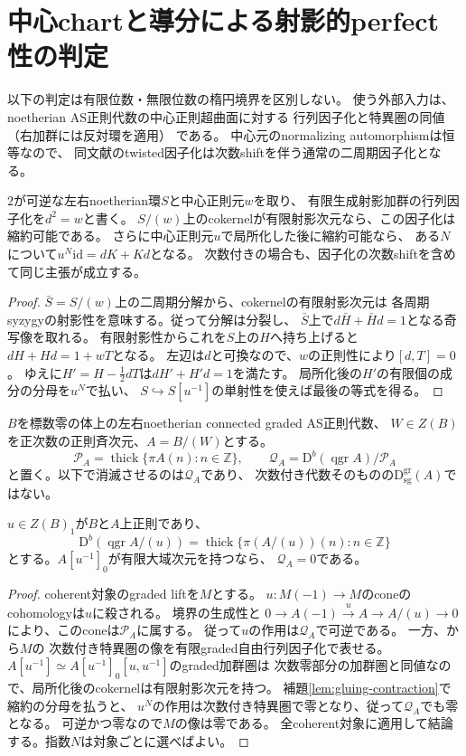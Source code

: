 \section{中心chartと導分による射影的perfect性の判定}
\label{sec:quotient-chart-gluing}
以下の判定は有限位数・無限位数の楕円境界を区別しない。
使う外部入力は、noetherian AS正則代数の中心正則超曲面に対する
行列因子化と特異圏の同値（右加群には反対環を適用）
\cite[Theorems~4.7, 5.5]{CCKM}である。
中心元のnormalizing automorphismは恒等なので、
同文献のtwisted因子化は次数shiftを伴う通常の二周期因子化となる。

\begin{lemma}[有限射影因子化の縮約と分母払い]
\label{lem:gluing-contraction}
$2$が可逆な左右noetherian環$S$と中心正則元$w$を取り、
有限生成射影加群の行列因子化を$d^2=w$と書く。
$S/(w)$上のcokernelが有限射影次元なら、この因子化は縮約可能である。
さらに中心正則元$u$で局所化した後に縮約可能なら、
ある$N$について$u^N\mathrm{id}=dK+Kd$となる。
次数付きの場合も、因子化の次数shiftを含めて同じ主張が成立する。
\end{lemma}
\begin{proof}
$\bar S=S/(w)$上の二周期分解から、cokernelの有限射影次元は
各周期syzygyの射影性を意味する。従って分解は分裂し、
$\bar S$上で$d\bar H+\bar Hd=1$となる奇写像を取れる。
有限射影性からこれを$S$上の$H$へ持ち上げると
$dH+Hd=1+wT$となる。
左辺は$d$と可換なので、$w$の正則性により$[d,T]=0$。
ゆえに$H'=H-\frac12dT$は$dH'+H'd=1$を満たす。
局所化後の$H'$の有限個の成分の分母を$u^N$で払い、
$S\hookrightarrow S[u^{-1}]$の単射性を使えば最後の等式を得る。
\end{proof}

$B$を標数零の体上の左右noetherian connected graded AS正則代数、
$W\in Z(B)$を正次数の正則斉次元、$A=B/(W)$とする。
\[
 \mathcal P_A=\operatorname{thick}\{\pi A(n):n\in\mathbb Z\},\qquad
 \mathcal Q_A=\mathrm D^b(\operatorname{qgr}A)/\mathcal P_A
\]
と置く。以下で消滅させるのは$\mathcal Q_A$であり、
次数付き代数そのものの$\mathrm D_{\mathrm{sg}}^{\mathrm{gr}}(A)$ではない。

\begin{proposition}[一つの中心chartと正則境界]
\label{prop:gluing-one-chart}
$u\in Z(B)_1$が$B$と$A$上正則であり、
\[
 \mathrm D^b(\operatorname{qgr}A/(u))
 =\operatorname{thick}\{\pi(A/(u))(n):n\in\mathbb Z\}
\]
とする。$A[u^{-1}]_0$が有限大域次元を持つなら、
$\mathcal Q_A=0$である。
\end{proposition}
\begin{proof}
coherent対象のgraded liftを$M$とする。
$u:M(-1)\to M$のconeのcohomologyは$u$に殺される。
境界の生成性と
$0\to A(-1)\xrightarrow{u}A\to A/(u)\to0$
により、このconeは$\mathcal P_A$に属する。
従って$u$の作用は$\mathcal Q_A$で可逆である。
一方、\cite[Theorems~4.7, 5.5]{CCKM}から$M$の
次数付き特異圏の像を有限graded自由行列因子化で表せる。
$A[u^{-1}]\simeq A[u^{-1}]_0[u,u^{-1}]$のgraded加群圏は
次数零部分の加群圏と同値なので、局所化後のcokernelは有限射影次元を持つ。
補題\ref{lem:gluing-contraction}で縮約の分母を払うと、
$u^N$の作用は次数付き特異圏で零となり、従って$\mathcal Q_A$でも零となる。
可逆かつ零なので$M$の像は零である。
全coherent対象に適用して結論する。指数$N$は対象ごとに選べばよい。
\end{proof}

